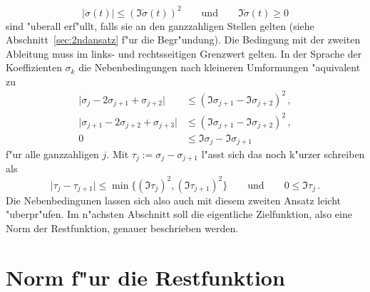 \documentclass[a4paper]{scrartcl}
\begin{document}
$$ \lvert\ddot\sigma(t)\rvert \le (\Im\dot\sigma(t))^2 
\qquad \text{und} \qquad
\Im\dot\sigma(t)\ge0 $$
sind "uberall erf"ullt, falls sie an den ganzzahligen Stellen gelten (siehe Abschnitt~\ref{sec:2ndansatz} f"ur die Begr"undung). Die Bedingung mit der zweiten Ableitung muss im links- und rechtsseitigen Grenzwert gelten. In der Sprache der Koeffizienten $\sigma_k$ die Nebenbedingungen nach kleineren Umformungen "aquivalent zu 
\begin{align*}
\lvert\sigma_j-2\sigma_{j+1}+\sigma_{j+2}\rvert 
&\le (\Im\sigma_{j+1}-\Im\sigma_{j+2})^2\,, \\
\lvert\sigma_{j+1}-2\sigma_{j+2}+\sigma_{j+3}\rvert 
&\le (\Im\sigma_{j+1}-\Im\sigma_{j+2})^2\,, \\
0&\le \Im\sigma_j-\Im\sigma_{j+1}
\end{align*}
f"ur alle ganzzahligen $j$. Mit 
$ \tau_j := \sigma_j-\sigma_{j+1} $
l"asst sich das noch k"urzer schreiben als
\begin{equation} \label{eq:condTau}
\lvert\tau_j-\tau_{j+1}\rvert \le \min\{(\Im\tau_j)^2, (\Im\tau_{j+1})^2\}
\qquad \text{und} \qquad
0\le\Im\tau_j\,.
\end{equation}
Die Nebenbedingunen lassen sich also auch mit diesem zweiten Ansatz leicht "uberpr"ufen. Im n"achsten Abschnitt soll die eigentliche Zielfunktion, also eine Norm der Restfunktion, genauer beschrieben werden.


\section{Norm f"ur die Restfunktion} \label{sec:norms4r}
\end{document}
